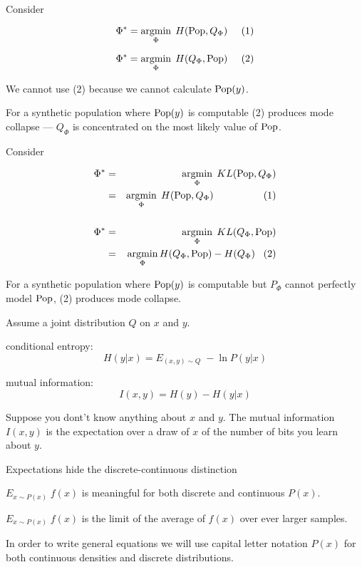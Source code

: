 {
Consider 


$$\Phi^* = \operatorname*{argmin}_\Phi \;H(\mathrm{Pop},Q_\Phi)\;\;\;\;\;(1)$$

\vfill
$$\Phi^* = \operatorname*{argmin}_\Phi \;H(Q_\Phi,\mathrm{Pop})\;\;\;\;\;(2)$$

\vfill
We cannot use (2) because we cannot calculate $\mathrm{Pop}(y)$.

\vfill
For a synthetic population where $\mathrm{Pop}(y)$ is computable (2) produces mode collapse --- $Q_\Phi$ is concentrated on the most likely value of $\mathrm{Pop}$.

Consider 


\begin{eqnarray*}
  \Phi^* & = & \operatorname*{argmin}_\Phi \;KL(\mathrm{Pop},Q_\Phi) \\
  & = & \operatorname*{argmin}_\Phi\; H(\mathrm{Pop},Q_\Phi)\;\;\;\;\;\;\;\;\;\;\;\;\;\;\;\;\;\;(1) \\
  \\
  \Phi^* & = & \operatorname*{argmin}_\Phi \;KL(Q_\Phi,\mathrm{Pop}) \\
  & = & \operatorname*{argmin}_\Phi H(Q_\Phi,\mathrm{Pop}) - H(Q_\Phi)\;\;\;(2)
  \end{eqnarray*}

\vfill
For a synthetic population where $\mathrm{Pop}(y)$ is computable but $P_\Phi$ cannot perfectly model $\mathrm{Pop}$, (2) produces mode collapse.


Assume a joint distribution $Q$  on $x$ and $y$.

\vfill
conditional entropy:
$$H(y|x) = E_{(x,y)\sim Q}\;-\ln P(y|x)$$

\vfill
mutual information:
$$I(x,y) = H(y) - H(y|x)$$

\vfill
Suppose you dont't know anything about $x$ and $y$. The mutual information $I(x,y)$ is the expectation over a draw of $x$ of
the number of bits you learn about $y$.


Expectations hide the discrete-continuous distinction

\vfill
$E_{x \sim P(x)}\;f(x)$ is meaningful for both discrete and continuous $P(x)$.

\vfill
$E_{x \sim P(x)}\;f(x)$ is the limit of the average of $f(x)$ over ever larger samples.

\vfill
In order to write general equations we will use capital letter notation $P(x)$ for both continuous densities and discrete distributions.

}
